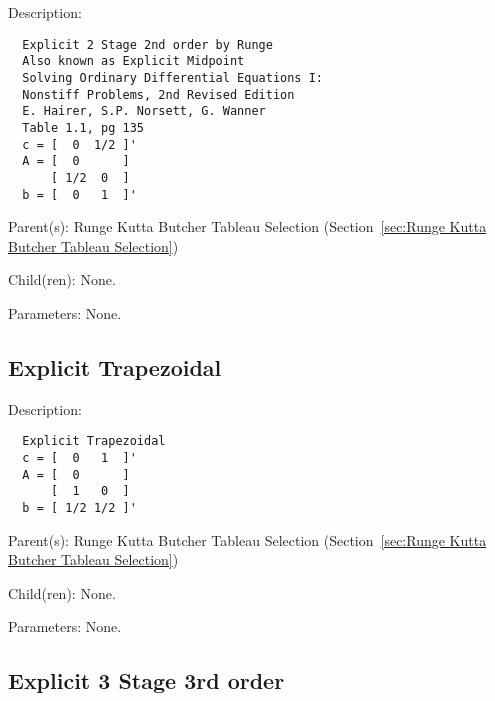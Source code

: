 \begin{list}{}
  {\setlength{\leftmargin}{1.0in}
   \setlength{\labelwidth}{0.75in}
   \setlength{\labelsep}{0.125in}}
  \item[Description:]
\begin{verbatim}
  Explicit 2 Stage 2nd order by Runge
  Also known as Explicit Midpoint
  Solving Ordinary Differential Equations I:
  Nonstiff Problems, 2nd Revised Edition
  E. Hairer, S.P. Norsett, G. Wanner
  Table 1.1, pg 135
  c = [  0  1/2 ]'
  A = [  0      ]
      [ 1/2  0  ]
  b = [  0   1  ]'
\end{verbatim}
  \item[Parent(s):]
    Runge Kutta Butcher Tableau Selection (Section~\ref{sec:Runge Kutta Butcher Tableau Selection})
  \item[Child(ren):]
    None. 
  \item[Parameters:]
    None. 
\end{list}

\subsection{Explicit Trapezoidal}
\label{sec:Explicit Trapezoidal}

\begin{list}{}
  {\setlength{\leftmargin}{1.0in}
   \setlength{\labelwidth}{0.75in}
   \setlength{\labelsep}{0.125in}}
  \item[Description:]
\begin{verbatim}
  Explicit Trapezoidal
  c = [  0   1  ]'
  A = [  0      ]
      [  1   0  ]
  b = [ 1/2 1/2 ]'
\end{verbatim}
  \item[Parent(s):]
    Runge Kutta Butcher Tableau Selection (Section~\ref{sec:Runge Kutta Butcher Tableau Selection})
  \item[Child(ren):]
    None. 
  \item[Parameters:]
    None. 
\end{list}

\subsection{Explicit 3 Stage 3rd order}
\label{sec:Explicit 3 Stage 3rd order}

